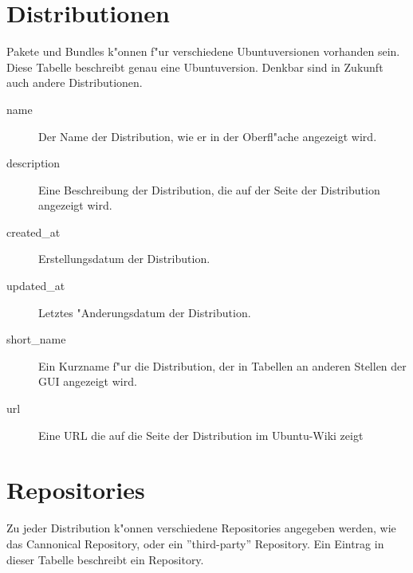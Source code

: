 \documentclass{article}
\begin{document}
\section{Distributionen}
\label{distributions}

Pakete und Bundles k"onnen f"ur verschiedene Ubuntuversionen vorhanden sein. Diese Tabelle beschreibt genau eine Ubuntuversion. Denkbar sind in Zukunft auch andere Distributionen.

\begin{description}
\item[name] Der Name der Distribution, wie er in der Oberfl"ache angezeigt wird.
\item[description] Eine Beschreibung der Distribution, die auf der Seite der Distribution angezeigt wird.
\item[created\_at] Erstellungsdatum der Distribution.
\item[updated\_at] Letztes "Anderungsdatum der Distribution.
\item[short\_name] Ein Kurzname f"ur die Distribution, der in Tabellen an anderen Stellen der GUI angezeigt wird.
\item[url] Eine URL die auf die Seite der Distribution im Ubuntu-Wiki zeigt
\end{description}

\section{Repositories}
\label{repositories}

Zu jeder Distribution k"onnen verschiedene Repositories angegeben werden, wie das Cannonical Repository, oder ein ''third-party'' Repository. Ein Eintrag in dieser Tabelle beschreibt ein Repository.
\end{document}
